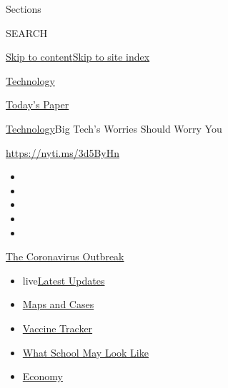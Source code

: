 Sections

SEARCH

\protect\hyperlink{site-content}{Skip to
content}\protect\hyperlink{site-index}{Skip to site index}

\href{https://www.nytimes3xbfgragh.onion/section/technology}{Technology}

\href{https://myaccount.nytimes3xbfgragh.onion/auth/login?response_type=cookie\&client_id=vi}{}

\href{https://www.nytimes3xbfgragh.onion/section/todayspaper}{Today's
Paper}

\href{/section/technology}{Technology}\textbar{}Big Tech's Worries
Should Worry You

\href{https://nyti.ms/3d5ByHn}{https://nyti.ms/3d5ByHn}

\begin{itemize}
\item
\item
\item
\item
\item
\end{itemize}

\href{https://www.nytimes3xbfgragh.onion/news-event/coronavirus?action=click\&pgtype=Article\&state=default\&region=TOP_BANNER\&context=storylines_menu}{The
Coronavirus Outbreak}

\begin{itemize}
\tightlist
\item
  live\href{https://www.nytimes3xbfgragh.onion/2020/08/01/world/coronavirus-covid-19.html?action=click\&pgtype=Article\&state=default\&region=TOP_BANNER\&context=storylines_menu}{Latest
  Updates}
\item
  \href{https://www.nytimes3xbfgragh.onion/interactive/2020/us/coronavirus-us-cases.html?action=click\&pgtype=Article\&state=default\&region=TOP_BANNER\&context=storylines_menu}{Maps
  and Cases}
\item
  \href{https://www.nytimes3xbfgragh.onion/interactive/2020/science/coronavirus-vaccine-tracker.html?action=click\&pgtype=Article\&state=default\&region=TOP_BANNER\&context=storylines_menu}{Vaccine
  Tracker}
\item
  \href{https://www.nytimes3xbfgragh.onion/interactive/2020/07/29/us/schools-reopening-coronavirus.html?action=click\&pgtype=Article\&state=default\&region=TOP_BANNER\&context=storylines_menu}{What
  School May Look Like}
\item
  \href{https://www.nytimes3xbfgragh.onion/live/2020/07/31/business/stock-market-today-coronavirus?action=click\&pgtype=Article\&state=default\&region=TOP_BANNER\&context=storylines_menu}{Economy}
\end{itemize}

